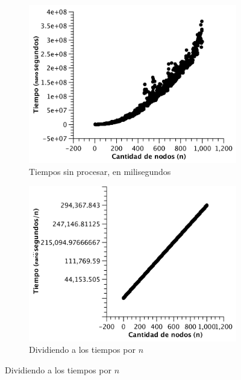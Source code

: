 \begin{figure}[H]
        \centering
\begin{subfigure}[b]{0.45\textwidth}
                \includegraphics[width=\textwidth]{imagenes/completo-listas-1.pdf}
                \caption{Tiempos sin procesar, en milisegundos}
        \end{subfigure}%
        \begin{subfigure}[b]{0.45\textwidth}
                \includegraphics[width=\textwidth]{imagenes/completo-listas-2.pdf}
                \caption{Dividiendo a los tiempos por $n$}
        \end{subfigure}
\end{figure}

